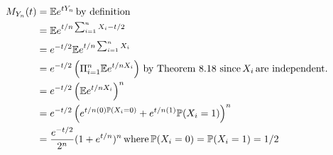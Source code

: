 
\begin{align*}
    M_{Y_{n} }(t) &= \mathbb{E} e^{t Y_{n} } \, \mbox{by definition} \\
		  &= \mathbb{E} e^{t/n \sum_{i=1}^{n} X_{i} - t/2} \\
		  &= e^{-t/2} \mathbb{E} e^{t/n \sum_{i=1}^{n} X_{i} } \\
		  &= e^{-t/2} \left( \Pi_{i=1}^{n} \mathbb{E} e^{t/n X_{i} }   \right) \, \mbox{by Theorem
		  8.18 since} \, X_{i} \, \mbox{are independent.} \\
		  &= e^{-t/2} \left( \mathbb{E} e^{t/n X_{i} }  \right)^{n} \\
		  &= e^{-t/2} \left( e^{t/n (0)  \mathbb P(X_{i} = 0)} + e^{t/n (1)} \mathbb P(X_{i} = 1)
		  \right)^{n} \\
		  &= \frac{e^{-t/2} }{2^{n} } (1 + e^{t/n} )^{n} \, \mbox{where} \, \mathbb P(X_{i} = 0)=
		  \mathbb P(X_{i} = 1)=1/2  
\end{align*}
